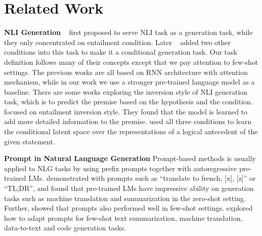 \section{Related Work}

\textbf{NLI Generation}
~\citet{DBLP:journals/corr/KolesnykRR16} first proposed to serve NLI task as a generation task, while they only concentrated on entailment condition. Later ~\citet{DBLP:journals/csl/StarcM17} added two other conditions into this task to make it a conditional generation task. Our task definition follows many of their concepts except that we pay attention to few-shot settings. The previous works are all based on RNN architecture with attention mechanism, while in our work we use a stronger pre-trained language model as a baseline. There are some works exploring the inversion style of NLI generation task, which is to predict the premise based on the hypothesis and the condition. \citet{DBLP:journals/corr/KolesnykRR16} focused on entailment inversion style. They found that the model is learned to add more detailed information to the premise. \citet{DBLP:journals/corr/abs-1803-02710} used all three conditions to learn the conditional latent space over the representations of a logical antecedent of the given statement.

\noindent
\textbf{Prompt in Natural Language Generation}
Prompt-based methods is usually applied to NLG tasks by using prefix prompts together with autoregressive pre-trained LMs. \citet{radford2019language} demonstrated with prompts such as ``translate to french, [x], [z]'' or ``TL;DR'', and found that pre-trained LMs have impressive ability on generation tasks such as machine translation and summarization in the zero-shot setting. Further, \citet{DBLP:conf/nips/BrownMRSKDNSSAA20} showed that prompts also performed well in few-shot settings. \citet{DBLP:journals/corr/abs-2012-11926, DBLP:journals/corr/abs-2106-10715, DBLP:conf/acl/LiL20, DBLP:journals/corr/abs-2107-03374} explored how to adapt prompts for few-shot text summarization, machine translation, data-to-text and code generation tasks.

